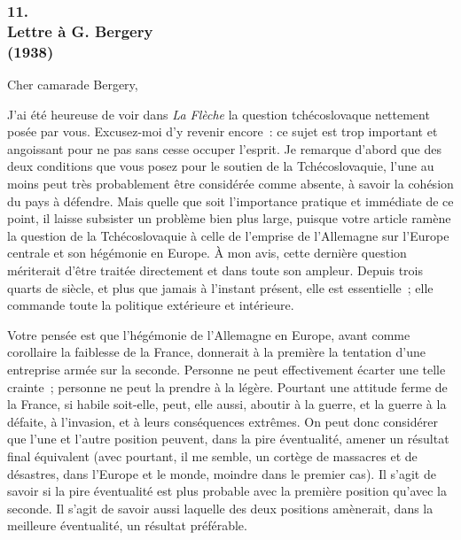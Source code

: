 \documentclass[french,twoside]{book} %
\begin{document}
\subsubsection[{11. Lettre à G. Bergery, (1938)}]{11. \\
Lettre à G. Bergery \\
(1938)}
\noindent \par
Cher camarade Bergery,\par
J'ai été heureuse de voir dans {\itshape La Flèche} la question tchécoslovaque nettement posée par vous. Excusez-moi d'y revenir encore : ce sujet est trop important et angoissant pour ne pas sans cesse occuper l'esprit. Je remarque d'abord que des deux conditions que vous posez pour le soutien de la Tchécoslovaquie, l'une au moins peut très probablement être considérée comme absente, à savoir la cohésion du pays à défendre. Mais quelle que soit l'importance pratique et immédiate de ce point, il laisse subsister un problème bien plus large, puisque votre article ramène la question de la Tchécoslo­vaquie à celle de l'emprise de l'Allemagne sur l'Europe centrale et son hégémonie en Europe. À mon avis, cette dernière question mériterait d'être traitée directement et dans toute son ampleur. Depuis trois quarts de siècle, et plus que jamais à l'instant présent, elle est essentielle ; elle commande toute la politique extérieure et intérieure.\par
Votre pensée est que l'hégémonie de l'Allemagne en Europe, avant comme corollaire la faiblesse de la France, donnerait à la première la tentation d'une entreprise armée sur la seconde. Personne ne peut effectivement écarter une telle crainte ; personne ne peut la prendre à la légère. Pourtant une attitude ferme de la France, si habile soit-elle, peut, elle aussi, aboutir à la guerre, et la guerre à la défaite, à l'invasion, et à leurs conséquences extrêmes. On peut donc considérer que l'une et l'autre position peuvent, dans la pire éventualité, amener un résultat final équivalent (avec pourtant, il me semble, un cortège de massacres et de désastres, dans l'Europe et le monde, moindre dans le premier cas). Il s'agit de savoir si la pire éventualité est plus probable avec la première position qu'avec la seconde. Il s'agit de savoir aussi laquelle des deux positions amènerait, dans la meilleure éventualité, un résultat préférable.\par
\end{document}
